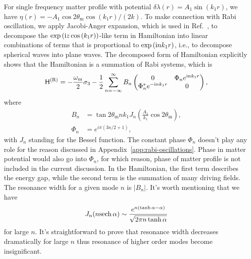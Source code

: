 For single frequency matter profile with potential $\delta\lambda(r) = A_1\sin(k_1 r)$, we have $\eta(r) = - A_1 \cos 2\theta_{\mathrm m} \cos (k_1 r)/(2 k) $. To make connection with Rabi oscillation, we apply Jacobi-Anger expansion, which is used in Ref.~\cite{Kneller2013}, to decompose the $\exp\left( \mathrm{i} z \cos\left(k_1 r \right) \right)$-like term in Hamiltonian into linear combinations of terms that is proportional to $\exp\left(\mathrm{i} n k_1 r \right)$, i.e., to decompose spherical waves into plane waves. The decomposed form of Hamiltonian explicitly shows that the Hamiltonian is a summation of Rabi systems, which is
\begin{equation}
    \mathsf H^{(\mathrm{R})} =
    -\frac{\omega_{\mathrm{m}}}{2} \sigma_3
    -  \frac{1}{2} \sum_{n=-\infty}^\infty B_n \begin{pmatrix}
    0 &  \Phi_n e^{\ri n k_1  r} \\
     \Phi_n^* e^{ - \ri n k_1 r} & 0
    \end{pmatrix},
    \label{chap:matter-sec:jacobi-eqn:hamil-jacobi-expanded}
\end{equation}
where
\begin{align}
    B_n &= \tan 2\theta_{\mathrm m} n k_1 J_{n} \left( \frac{A_1}{k_1}\cos 2\theta_{\mathrm m} \right),\\
    \Phi_n &= e^{i\pi (3n/2+1)},
\end{align}
with $J_n$ standing for the Bessel function.
The constant phase $\Phi_n$ doesn't play any role for the reason discussed in Appendix~\ref{app:rabi-oscillations}. Phase in matter potential would also go into $\Phi_n$, for which reason, phase of matter profile is not included in the current discussion. In the Hamiltonian, the first term describes the energy gap, while the second term is the summation of many driving fields. The resonance width for a given mode $n$ is $\lvert B_{n}\rvert$. It's worth mentioning that we have~\cite{Ploumistakis20092897}
\begin{equation}
J_n(n {\operatorname{sech}{\alpha}}) \sim \frac{ e^{n(\tanh\alpha - \alpha)} }{\sqrt{ 2\pi n \tanh \alpha } }
\end{equation}
for large $n$. It's straightforward to prove that resonance width decreases dramatically for large $n$ thus resonance of higher order modes become insignificant.



